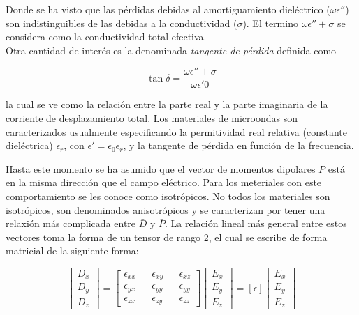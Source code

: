 Donde se ha visto que las pérdidas debidas al amortiguamiento dieléctrico ($\omega \epsilon''$) son indistinguibles de las debidas a la conductividad ($\sigma$). El termino $\omega \epsilon'' + \sigma$ se considera como la conductividad total efectiva.\\

Otra cantidad de interés es la denominada \textit{tangente de pérdida} definida como 

\begin{equation*}
\tan \delta = \frac{\omega \epsilon'' + \sigma}{\omega \epsilon'0}
\end{equation*}

la cual se ve como la relación entre la parte real y la parte imaginaria de la corriente de desplazamiento total. Los materiales de microondas son caracterizados usualmente especificando la permitividad real relativa (constante dieléctrica) $\epsilon_r$, con $\epsilon' = \epsilon_0 \epsilon_r$, y la tangente de pérdida en función de la frecuencia. 

Hasta este momento se ha asumido que el vector de momentos dipolares $\bar{P}$ está en la misma dirección que el campo eléctrico. Para los meteriales con este comportamiento se les conoce como isotrópicos. No todos los materiales son isotrópicos, son denominados anisotrópicos y se caracterizan por tener una relaxión más complicada entre $\bar{D}$ y $\bar{P}$. La relación lineal más general entre estos vectores toma la forma de un tensor de rango 2, el cual se escribe de forma matricial de la siguiente forma:

\begin{equation*}
\left[
\begin{aligned}
    D_x \\
    D_y \\
    D_z
\end{aligned}
\right] = 
\left[
\begin{aligned}
    \epsilon_{xx} && \epsilon_{xy}  && \epsilon_{xz}  \\
    \epsilon_{yx} && \epsilon_{yy}  && \epsilon_{yy}  \\
    \epsilon_{zx} && \epsilon_{zy}  && \epsilon_{zz}  
\end{aligned}
\right]
\left[
\begin{aligned}
    E_x \\
    E_y \\
    E_z
\end{aligned}
\right] = [\epsilon]
\left[
\begin{aligned}
    E_x \\
    E_y \\
    E_z
\end{aligned}
\right]
\end{equation*}

